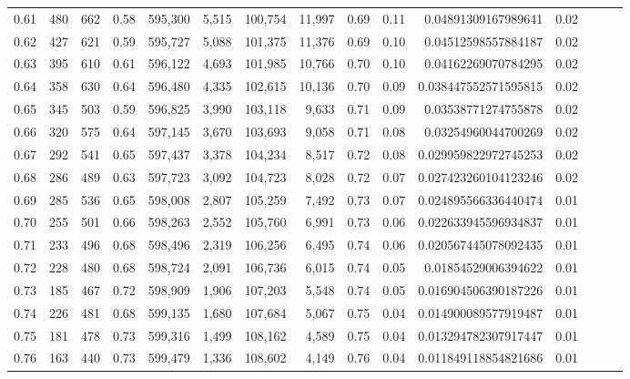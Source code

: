 \begin{tabular}{rrrrrrrrrrrrrrr}
0.61 &     480 &    662 &  0.58 &  595,300 &    5,515 &  100,754 &   11,997 &  0.69 &  0.11 &     0.04891309167989641 &      0.02 \\
0.62 &     427 &    621 &  0.59 &  595,727 &    5,088 &  101,375 &   11,376 &  0.69 &  0.10 &     0.04512598557884187 &      0.02 \\
0.63 &     395 &    610 &  0.61 &  596,122 &    4,693 &  101,985 &   10,766 &  0.70 &  0.10 &     0.04162269070784295 &      0.02 \\
0.64 &     358 &    630 &  0.64 &  596,480 &    4,335 &  102,615 &   10,136 &  0.70 &  0.09 &    0.038447552571595815 &      0.02 \\
0.65 &     345 &    503 &  0.59 &  596,825 &    3,990 &  103,118 &    9,633 &  0.71 &  0.09 &     0.03538771274755878 &      0.02 \\
0.66 &     320 &    575 &  0.64 &  597,145 &    3,670 &  103,693 &    9,058 &  0.71 &  0.08 &     0.03254960044700269 &      0.02 \\
0.67 &     292 &    541 &  0.65 &  597,437 &    3,378 &  104,234 &    8,517 &  0.72 &  0.08 &    0.029959822972745253 &      0.02 \\
0.68 &     286 &    489 &  0.63 &  597,723 &    3,092 &  104,723 &    8,028 &  0.72 &  0.07 &    0.027423260104123246 &      0.02 \\
0.69 &     285 &    536 &  0.65 &  598,008 &    2,807 &  105,259 &    7,492 &  0.73 &  0.07 &    0.024895566336440474 &      0.01 \\
0.70 &     255 &    501 &  0.66 &  598,263 &    2,552 &  105,760 &    6,991 &  0.73 &  0.06 &    0.022633945596934837 &      0.01 \\
0.71 &     233 &    496 &  0.68 &  598,496 &    2,319 &  106,256 &    6,495 &  0.74 &  0.06 &    0.020567445078092435 &      0.01 \\
0.72 &     228 &    480 &  0.68 &  598,724 &    2,091 &  106,736 &    6,015 &  0.74 &  0.05 &     0.01854529006394622 &      0.01 \\
0.73 &     185 &    467 &  0.72 &  598,909 &    1,906 &  107,203 &    5,548 &  0.74 &  0.05 &    0.016904506390187226 &      0.01 \\
0.74 &     226 &    481 &  0.68 &  599,135 &    1,680 &  107,684 &    5,067 &  0.75 &  0.04 &    0.014900089577919487 &      0.01 \\
0.75 &     181 &    478 &  0.73 &  599,316 &    1,499 &  108,162 &    4,589 &  0.75 &  0.04 &    0.013294782307917447 &      0.01 \\
0.76 &     163 &    440 &  0.73 &  599,479 &    1,336 &  108,602 &    4,149 &  0.76 &  0.04 &    0.011849118854821686 &      0.01 \\

\end{tabular}
